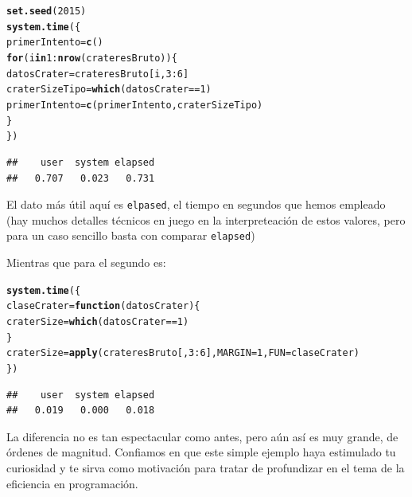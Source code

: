 \documentclass[10pt,a4paper]{article}\usepackage[]{graphicx}\usepackage[]{color}
\makeatletter
\newcommand{\hlnum}[1]{\textcolor[rgb]{0.686,0.059,0.569}{#1}}%
\newcommand{\hlopt}[1]{\textcolor[rgb]{0,0,0}{#1}}%
\newcommand{\hlstd}[1]{\textcolor[rgb]{0.345,0.345,0.345}{#1}}%
\newcommand{\hlkwa}[1]{\textcolor[rgb]{0.161,0.373,0.58}{\textbf{#1}}}%
\newcommand{\hlkwb}[1]{\textcolor[rgb]{0.69,0.353,0.396}{#1}}%
\newcommand{\hlkwc}[1]{\textcolor[rgb]{0.333,0.667,0.333}{#1}}%
\newcommand{\hlkwd}[1]{\textcolor[rgb]{0.737,0.353,0.396}{\textbf{#1}}}%
\newenvironment{kframe}{%
 \def\at@end@of@kframe{}%
 \ifinner\ifhmode%
  \def\at@end@of@kframe{\end{minipage}}%
  \begin{minipage}{\columnwidth}%
 \fi\fi%
 \def\FrameCommand##1{\hskip\@totalleftmargin \hskip-\fboxsep
 \colorbox{shadecolor}{##1}\hskip-\fboxsep
     \hskip-\linewidth \hskip-\@totalleftmargin \hskip\columnwidth}%
 \MakeFramed {\advance\hsize-\width
   \@totalleftmargin\z@ \linewidth\hsize
   \@setminipage}}%
 {\par\unskip\endMakeFramed%
 \at@end@of@kframe}
\newenvironment{knitrout}{}{} %
\makeatother
\begin{document}
\begin{knitrout}
\color{fgcolor}\begin{kframe}
\begin{alltt}
\hlkwd{set.seed}\hlstd{(}\hlnum{2015}\hlstd{)}
\hlkwd{system.time}\hlstd{(\{}
  \hlstd{primerIntento} \hlkwb{=} \hlkwd{c}\hlstd{()}
  \hlkwa{for}\hlstd{(i} \hlkwa{in} \hlnum{1}\hlopt{:}\hlkwd{nrow}\hlstd{(crateresBruto))\{}
    \hlstd{datosCrater} \hlkwb{=} \hlstd{crateresBruto[i,} \hlnum{3}\hlopt{:}\hlnum{6}\hlstd{]}
    \hlstd{craterSizeTipo} \hlkwb{=} \hlkwd{which}\hlstd{(datosCrater} \hlopt{==} \hlnum{1}\hlstd{)}
    \hlstd{primerIntento} \hlkwb{=} \hlkwd{c}\hlstd{(primerIntento, craterSizeTipo)}
  \hlstd{\}}
\hlstd{\})}
\end{alltt}
\begin{verbatim}
##    user  system elapsed 
##   0.707   0.023   0.731
\end{verbatim}
\end{kframe}
\end{knitrout}
El dato más útil aquí es {\tt elpased}, el tiempo en segundos que hemos empleado (hay muchos detalles técnicos en juego en la interpreteación de estos valores, pero para un caso sencillo basta con comparar {\tt elapsed})

Mientras que para el segundo es:
\begin{knitrout}
\color{fgcolor}\begin{kframe}
\begin{alltt}
\hlkwd{system.time}\hlstd{(\{}
  \hlstd{claseCrater} \hlkwb{=} \hlkwa{function}\hlstd{(}\hlkwc{datosCrater}\hlstd{)\{}
    \hlstd{craterSize} \hlkwb{=} \hlkwd{which}\hlstd{(datosCrater} \hlopt{==} \hlnum{1}\hlstd{)}
  \hlstd{\}}
\hlstd{craterSize} \hlkwb{=} \hlkwd{apply}\hlstd{(crateresBruto[,} \hlnum{3}\hlopt{:}\hlnum{6}\hlstd{],} \hlkwc{MARGIN} \hlstd{=} \hlnum{1}\hlstd{,} \hlkwc{FUN} \hlstd{= claseCrater)}
\hlstd{\})}
\end{alltt}
\begin{verbatim}
##    user  system elapsed 
##   0.019   0.000   0.018
\end{verbatim}
\end{kframe}
\end{knitrout}
La diferencia no es tan espectacular como antes, pero aún así es muy grande, de órdenes de magnitud. Confiamos en que este simple ejemplo haya estimulado tu curiosidad y te sirva como motivación para tratar de profundizar en el tema de la eficiencia en programación.
\end{document}
